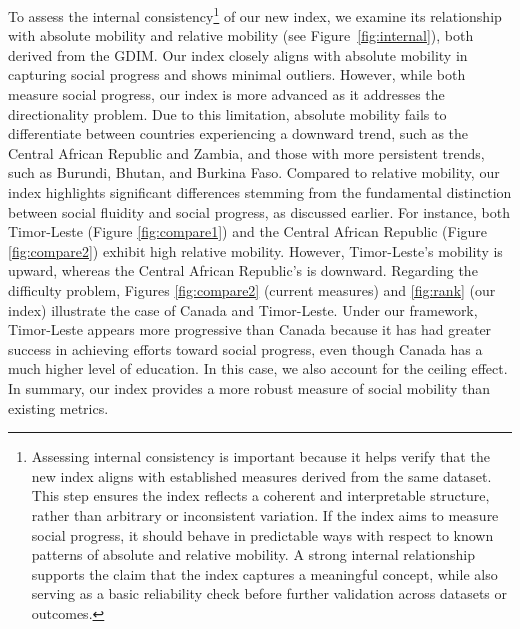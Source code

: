 To assess the internal consistency\footnote{Assessing internal consistency is important because it helps verify that the new index aligns with established measures derived from the same dataset. This step ensures the index reflects a coherent and interpretable structure, rather than arbitrary or inconsistent variation. If the index aims to measure social progress, it should behave in predictable ways with respect to known patterns of absolute and relative mobility. A strong internal relationship supports the claim that the index captures a meaningful concept, while also serving as a basic reliability check before further validation across datasets or outcomes.} of our new index, we examine its relationship with absolute mobility and relative mobility (see Figure~\ref{fig:internal}), both derived from the GDIM. Our index closely aligns with absolute mobility in capturing social progress and shows minimal outliers. However, while both measure social progress, our index is more advanced as it addresses the directionality problem. Due to this limitation, absolute mobility fails to differentiate between countries experiencing a downward trend, such as the Central African Republic and Zambia, and those with more persistent trends, such as Burundi, Bhutan, and Burkina Faso. Compared to relative mobility, our index highlights significant differences stemming from the fundamental distinction between social fluidity and social progress, as discussed earlier. For instance, both Timor-Leste (Figure \ref{fig:compare1}) and the Central African Republic (Figure \ref{fig:compare2}) exhibit high relative mobility. However, Timor-Leste's mobility is upward, whereas the Central African Republic's is downward. Regarding the difficulty problem, Figures \ref{fig:compare2} (current measures) and \ref{fig:rank} (our index) illustrate the case of Canada and Timor-Leste. Under our framework, Timor-Leste appears more progressive than Canada because it has had greater success in achieving efforts toward social progress, even though Canada has a much higher level of education. In this case, we also account for the ceiling effect. In summary, our index provides a more robust measure of social mobility than existing metrics.

